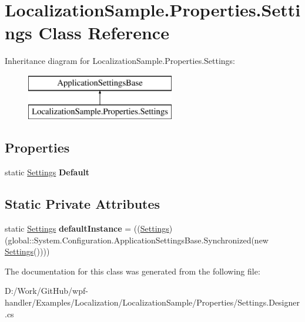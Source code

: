 \hypertarget{class_localization_sample_1_1_properties_1_1_settings}{}\section{Localization\+Sample.\+Properties.\+Settings Class Reference}
\label{class_localization_sample_1_1_properties_1_1_settings}
Inheritance diagram for Localization\+Sample.\+Properties.\+Settings\+:\begin{figure}[H]
\begin{center}
\leavevmode
\includegraphics[height=2.000000cm]{d5/d33/class_localization_sample_1_1_properties_1_1_settings}
\end{center}
\end{figure}
\subsection*{Properties}
\begin{DoxyCompactItemize}
\item 
\mbox{\label{class_localization_sample_1_1_properties_1_1_settings_a62c564e58f7fa3087550c6b4a0acf3f3}} 
static \mbox{\hyperlink{class_localization_sample_1_1_properties_1_1_settings}{Settings}} {\bfseries Default}
\end{DoxyCompactItemize}
\subsection*{Static Private Attributes}
\begin{DoxyCompactItemize}
\item 
\mbox{\label{class_localization_sample_1_1_properties_1_1_settings_ada15578a2c01bf6f1cf1794113a37aab}} 
static \mbox{\hyperlink{class_localization_sample_1_1_properties_1_1_settings}{Settings}} {\bfseries default\+Instance} = ((\mbox{\hyperlink{class_localization_sample_1_1_properties_1_1_settings}{Settings}})(global\+::\+System.\+Configuration.\+Application\+Settings\+Base.\+Synchronized(new \mbox{\hyperlink{class_localization_sample_1_1_properties_1_1_settings}{Settings}}())))
\end{DoxyCompactItemize}


The documentation for this class was generated from the following file\+:\begin{DoxyCompactItemize}
\item 
D\+:/\+Work/\+Git\+Hub/wpf-\/handler/\+Examples/\+Localization/\+Localization\+Sample/\+Properties/Settings.\+Designer.\+cs\end{DoxyCompactItemize}
